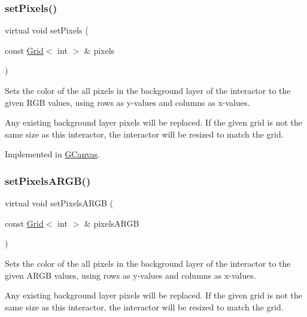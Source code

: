 \subsubsection{\texorpdfstring{set\+Pixels()}{setPixels()}}
{\footnotesize\ttfamily virtual void set\+Pixels (\begin{DoxyParamCaption}\item[{const \mbox{\hyperlink{classGrid}{Grid}}$<$ int $>$ \&}]{pixels }\end{DoxyParamCaption})\hspace{0.3cm}{\ttfamily [pure virtual]}}



Sets the color of the all pixels in the background layer of the interactor to the given R\+GB values, using rows as y-\/values and columns as x-\/values. 

Any existing background layer pixels will be replaced. If the given grid is not the same size as this interactor, the interactor will be resized to match the grid. 

Implemented in \mbox{\hyperlink{classGCanvas_a83fcae972f2677bf1ece054930f53162}{G\+Canvas}}.

\mbox{\label{classGDrawingSurface_a7d813f0f29751a217201f24cef402306}} 
\subsubsection{\texorpdfstring{set\+Pixels\+A\+R\+G\+B()}{setPixelsARGB()}}
{\footnotesize\ttfamily virtual void set\+Pixels\+A\+R\+GB (\begin{DoxyParamCaption}\item[{const \mbox{\hyperlink{classGrid}{Grid}}$<$ int $>$ \&}]{pixels\+A\+R\+GB }\end{DoxyParamCaption})\hspace{0.3cm}{\ttfamily [pure virtual]}}



Sets the color of the all pixels in the background layer of the interactor to the given A\+R\+GB values, using rows as y-\/values and columns as x-\/values. 

Any existing background layer pixels will be replaced. If the given grid is not the same size as this interactor, the interactor will be resized to match the grid. 


